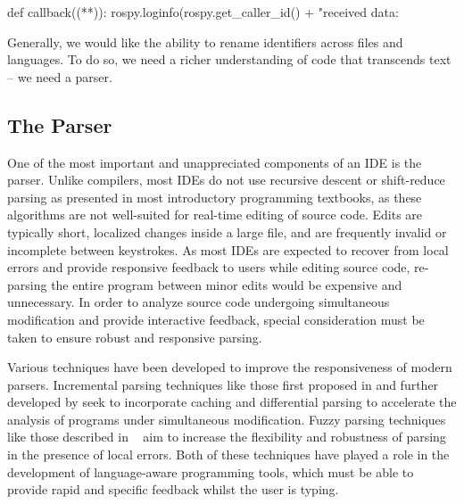 \documentclass[12pt,initial,twoside,maitrise]{dms}
\numberwithin{equation}{section}
\numberwithin{table}{chapter}
\numberwithin{figure}{chapter}
\begin{document}
\begin{pythonlisting}
def callback((**)):
    rospy.loginfo(rospy.get_caller_id() + "received data: %
\end{pythonlisting}
%
Generally, we would like the ability to rename identifiers across files and languages. To do so, we need a richer understanding of code that transcends text -- we need a parser.

\subsection{The Parser}\label{subsec:the-parser}

One of the most important and unappreciated components of an IDE is the parser. Unlike compilers, most IDEs do not use recursive descent or shift-reduce parsing as presented in most introductory programming textbooks, as these algorithms are not well-suited for real-time editing of source code. Edits are typically short, localized changes inside a large file, and are frequently invalid or incomplete between keystrokes. As most IDEs are expected to recover from local errors and provide responsive feedback to users while editing source code, re-parsing the entire program between minor edits would be expensive and unnecessary. In order to analyze source code undergoing simultaneous modification and provide interactive feedback, special consideration must be taken to ensure robust and responsive parsing.

Various techniques have been developed to improve the responsiveness of modern parsers. Incremental parsing techniques like those first proposed in \citet{ghezzi1979incremental} and further developed by \citet{wagner1997practical,wagner1997incremental} seek to incorporate caching and differential parsing to accelerate the analysis of programs under simultaneous modification. Fuzzy parsing techniques like those described in ~\citet{koppler1997systematic} aim to increase the flexibility and robustness of parsing in the presence of local errors. Both of these techniques have played a role in the development of language-aware programming tools, which must be able to provide rapid and specific feedback whilst the user is typing.
\end{document}
